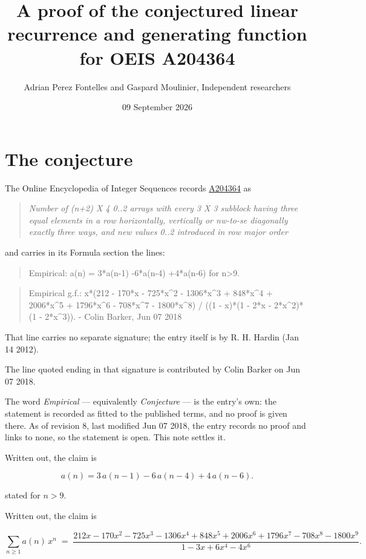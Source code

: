 \documentclass[11pt]{article}
\title{A proof of the conjectured linear recurrence and generating function for OEIS A204364}
\author{Adrian Perez Fontelles and Gaspard Moulinier, Independent researchers}
\date{09 September 2026}
\theoremstyle{definition}
\begin{document}
\maketitle
\section{The conjecture}

The Online Encyclopedia of Integer Sequences records \href{https://oeis.org/A204364}{A204364} as

\begin{quote}\itshape Number of (n+2) X 4 0..2 arrays with every 3 X 3 subblock having three equal elements in a row horizontally, vertically or nw-to-se diagonally exactly three ways, and new values 0..2 introduced in row major order\end{quote}

and carries in its Formula section the lines:

\begin{quote}\ttfamily Empirical: a(n) = 3*a(n-1) -6*a(n-4) +4*a(n-6) for n>9.\end{quote}

\begin{quote}\ttfamily Empirical g.f.: x*(212 - 170*x - 725*x\textasciicircum{}2 - 1306*x\textasciicircum{}3 + 848*x\textasciicircum{}4 + 2006*x\textasciicircum{}5 + 1796*x\textasciicircum{}6 - 708*x\textasciicircum{}7 - 1800*x\textasciicircum{}8) / ((1 - x)*(1 - 2*x - 2*x\textasciicircum{}2)*(1 - 2*x\textasciicircum{}3)). - Colin Barker, Jun 07 2018\end{quote}

That line carries no separate signature; the entry itself is by R. H. Hardin (Jan 14 2012).

The line quoted ending in that signature is contributed by Colin Barker on Jun 07 2018.

The word {\itshape Empirical} --- equivalently {\itshape Conjecture} --- is the entry's own: the statement is recorded as fitted to the published terms, and no proof is given there. As of revision 8, last modified Jun 07 2018, the entry records no proof and links to none, so the statement is open. This note settles it.

Written out, the claim is

\[a(n) = 3\,a(n-1) - 6\,a(n-4) + 4\,a(n-6).\]

stated for $n > 9$.

Written out, the claim is

\[\sum_{n \ge 1} a(n)\,x^n \;=\; \frac{212x - 170x^{2} - 725x^{3} - 1306x^{4} + 848x^{5} + 2006x^{6} + 1796x^{7} - 708x^{8} - 1800x^{9}}{1 - 3x + 6x^{4} - 4x^{6}}.\]
\end{document}
